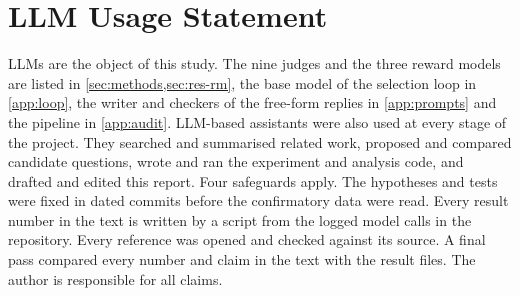\documentclass[11pt,letterpaper]{article}
\begin{document}
\section*{LLM Usage Statement}
LLMs are the object of this study. The nine judges and the three reward models are listed in \cref{sec:methods,sec:res-rm}, the base model of the selection loop in \cref{app:loop}, the writer and checkers of the free-form replies in \cref{app:prompts} and the pipeline in \cref{app:audit}. LLM-based assistants were also used at every stage of the project. They searched and summarised related work, proposed and compared candidate questions, wrote and ran the experiment and analysis code, and drafted and edited this report. Four safeguards apply. The hypotheses and tests were fixed in dated commits before the confirmatory data were read. Every result number in the text is written by a script from the logged model calls in the repository. Every reference was opened and checked against its source. A final pass compared every number and claim in the text with the result files. The author is responsible for all claims.
\end{document}
